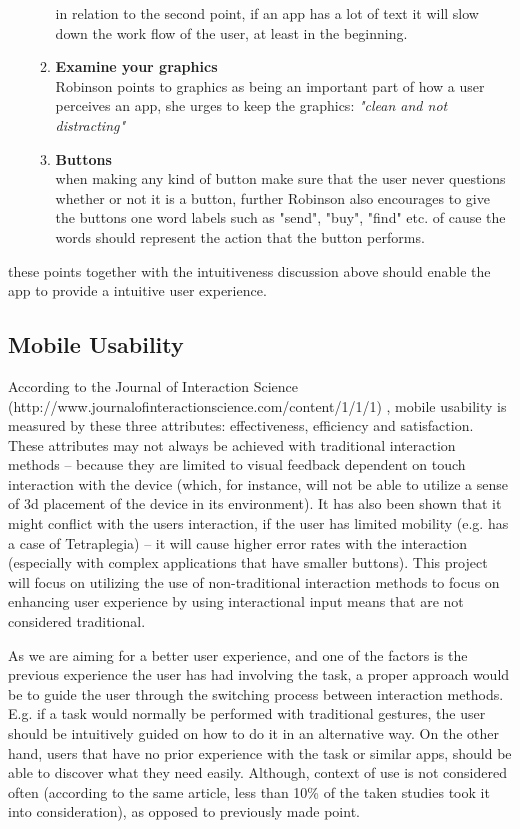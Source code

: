 \begin{itemize}
\begin{enumerate}
 in relation to the second point, if an app has a lot of text it will slow down the work flow of the user, at least in the beginning.
 \item \textbf{Examine your graphics}\\
 Robinson points to graphics as being an important part of how a user perceives an app, she urges to keep the graphics: \textit{"clean and not distracting"} 
 \item \textbf{Buttons}\\ \label{robinsonUX}
 when making any kind of button make sure that the user never questions whether or not it is a button, further Robinson also encourages to give the buttons one word labels such as "send", "buy", "find" etc. of cause the words should represent the action that the button performs.
 \end{enumerate}\cite{UXKeys} 
\end{itemize} 
these points together with the intuitiveness discussion above should enable the app to provide a intuitive user experience. 

\subsection{Mobile Usability}
According to the Journal of Interaction Science (http://www.journalofinteractionscience.com/content/1/1/1) , mobile usability is measured by these three attributes: effectiveness, efficiency and satisfaction. These attributes may not always be achieved with traditional interaction methods – because they are limited to visual feedback dependent on touch interaction with the device (which, for instance, will not be able to utilize a sense of 3d placement of the device in its environment). It has also been shown that it might conflict with the users interaction, if the user has limited mobility (e.g. has a case of Tetraplegia) – it will cause higher error rates with the interaction (especially with complex applications that have smaller buttons). This project will focus on utilizing the use of non-traditional interaction methods to focus on enhancing user experience by using interactional input means that are not considered traditional.

As we are aiming for a better user experience, and one of the factors is the previous experience the user has had involving the task, a proper approach would be to guide the user through the switching process between interaction methods. E.g. if a task would normally be performed with traditional gestures, the user should be intuitively guided on how to do it in an alternative way. On the other hand, users that have no prior experience with the task or similar apps, should be able to discover what they need easily. Although, context of use is not considered often (according to the same article, less than 10\% of the taken studies took it into consideration), as opposed to previously made point.